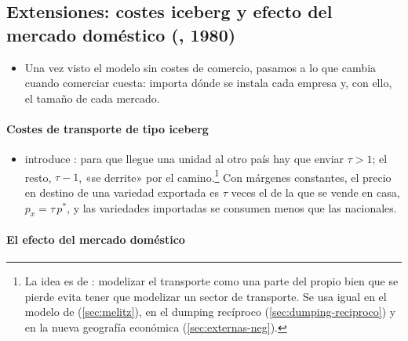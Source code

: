 \documentclass[11pt]{article}
\begin{document}
\subsection{Extensiones: costes iceberg y efecto del mercado doméstico (, 1980)}\label{sec:extensiones-krugman}

\begin{itemize}
\item Una vez visto el modelo sin costes de comercio, pasamos a lo que cambia cuando comerciar cuesta: importa dónde se instala cada empresa y, con ello, el tamaño de cada mercado.
\end{itemize}

\paragraph{Costes de transporte de tipo iceberg}

\begin{itemize}
\item \textcite{Krugman1980Scale} introduce : para que llegue una unidad al otro país hay que enviar $\tau>1$; el resto, $\tau-1$, «se derrite» por el camino.\footnote{La idea es de \textcite{Samuelson1952Transfer}: modelizar el transporte como una parte del propio bien que se pierde evita tener que modelizar un sector de transporte. Se usa igual en el modelo de  (\ref{sec:melitz}), en el dumping recíproco (\ref{sec:dumping-reciproco}) y en la nueva geografía económica (\ref{sec:externas-neg}).} Con márgenes constantes, el precio en destino de una variedad exportada es $\tau$ veces el de la que se vende en casa, $p_x=\tau\,p^*$, y las variedades importadas se consumen menos que las nacionales.
\end{itemize}

\paragraph{El efecto del mercado doméstico}
\end{document}

